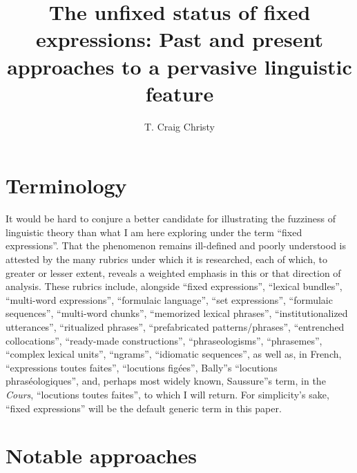 \documentclass[output=paper]{langsci/langscibook}
\author{T. Craig Christy\affiliation{University of North Alabama}\orcid{}}
\title{The unfixed status of fixed expressions: Past and present approaches to a pervasive linguistic feature}
\begin{document}
\maketitle

\section{Terminology}

It would be hard to conjure a better candidate for illustrating the fuzziness of linguistic theory than what I am here exploring under the term ``fixed expressions''. That the phenomenon remains ill-defined and poorly understood is attested by the many rubrics under which it is researched, each of which, to greater or lesser extent, reveals a weighted emphasis in this or that direction of analysis. These rubrics include, alongside ``fixed expressions'', ``lexical bundles'', ``multi-word expressions'', ``formulaic language'', ``set expressions'', ``formulaic sequences'', ``multi-word chunks'', ``memorized lexical phrases'', ``institutionalized utterances'', ``ritualized phrases'', ``prefabricated patterns/phrases'', ``entrenched collocations'', ``ready-made constructions'', ``phraseologisms'', ``phrasemes'', ``complex lexical units'', ``ngrams'', ``idiomatic sequences'', as well as, in French, ``expressions toutes faites'', ``locutions figées'', Bally''s ``locutions phraséologiques'', and, perhaps most widely known, Saussure''s term, in the \textit{Cours}, ``locutions toutes faites'', to which I will return. For simplicity's sake, ``fixed expressions'' will be the default generic term in this paper. 

\section{Notable approaches}
\end{document}
